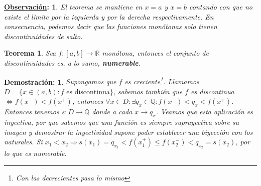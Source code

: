 \documentclass[10pt,a4paper,openright]{book}
\theoremstyle{break}
\newtheorem*{theo}{Teorema}
\newtheorem*{demo}{\underline{Demostración}:}
\newtheorem*{obs}{\underline{Observación}:}
\begin{document}
\begin{obs}
El teorema se mantiene en $x=a$ y $x=b$ contando con que no existe el límite por la izquierda y por la derecha respectivamente. En consecuencia, podemos decir que las funciones monótonas solo tienen discontinuidades de salto.
\end{obs}

\begin{theo}
Sea $f:[a,b]\rightarrow \mathbb R$ monótona, entonces el conjunto de discontinuidades es, a lo sumo, \textbf{numerable}.
\end{theo}
\begin{demo}
Supongamos que $f$ es creciente\footnote{Con las decrecientes pasa lo mismo}. Llamamos $D=\{x\in (a,b): f \mbox{ es discontinua}\}$, sabemos también que $f$ es discontinua $\Leftrightarrow f(x^-)< f(x^+)$, entonces $\forall x \in D: \exists q_x\in \mathbb Q: f(x^-)<q_x<f(x^+)$. Entonces tenemos $s:D \rightarrow \mathbb Q$ donde a cada $x\rightarrow q_x$. Veamos que esta aplicación es inyectiva, por que sabemos que una función es siempre suprayectiva sobre su imagen y demostrar la inyectividad supone poder establecer una biyección con los naturales. Si $x_1<x_2\Rightarrow s(x_1)=q_{x_1}<f(x_1^+)\leq f(x_2^-)< q_{x_2}=s(x_2)$, por lo que es numerable.
\end{demo}
\end{document}
